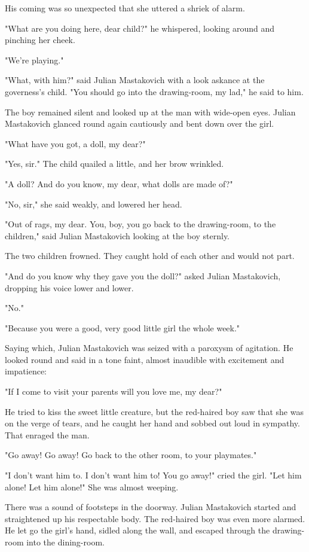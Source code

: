 His coming was so unexpected that she uttered a shriek of alarm.

"What are you doing here, dear child?" he whispered, looking around
and pinching her cheek.

"We're playing."

"What, with him?" said Julian Mastakovich with a look askance at the
governess's child. "You should go into the drawing-room, my lad," he
said to him.

The boy remained silent and looked up at the man with wide-open eyes.
Julian Mastakovich glanced round again cautiously and bent down over
the girl.

"What have you got, a doll, my dear?"

"Yes, sir." The child quailed a little, and her brow wrinkled.

"A doll? And do you know, my dear, what dolls are made of?"

"No, sir," she said weakly, and lowered her head.

"Out of rags, my dear. You, boy, you go back to the drawing-room, to
the children," said Julian Mastakovich looking at the boy sternly.

The two children frowned. They caught hold of each other and would not
part.

"And do you know why they gave you the doll?" asked Julian
Mastakovich, dropping his voice lower and lower.

"No."

"Because you were a good, very good little girl the whole week."

Saying which, Julian Mastakovich was seized with a paroxysm of
agitation. He looked round and said in a tone faint, almost inaudible
with excitement and impatience:

"If I come to visit your parents will you love me, my dear?"

He tried to kiss the sweet little creature, but the red-haired boy saw
that she was on the verge of tears, and he caught her hand and sobbed
out loud in sympathy. That enraged the man.

"Go away! Go away! Go back to the other room, to your playmates."

"I don't want him to. I don't want him to! You go away!" cried the
girl. "Let him alone! Let him alone!" She was almost weeping.

There was a sound of footsteps in the doorway. Julian Mastakovich
started and straightened up his respectable body. The red-haired boy
was even more alarmed. He let go the girl's hand, sidled along the
wall, and escaped through the drawing-room into the dining-room.

